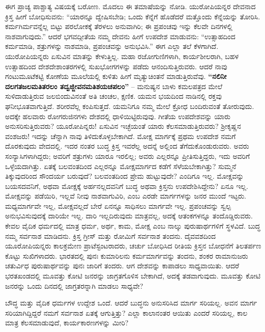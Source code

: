 ಈಗ ಪ್ರಾಚ್ಯ ಪಾಶ್ಚಾತ್ಯ ವಿಷಯಕ್ಕೆ ಬರೋಣ. ಮೊದಲು ಈ ತಮಾಷೆಯನ್ನು ನೋಡಿ. ಯುರೋಪಿಯನ್ನರ ದೇವನಾದ ಕ್ರಿಸ್ತ ಹೀಗೆ ಬೋಧಿಸುವನು: “ಯಾರನ್ನೂ ದ್ವೇಷಿಸಬೇಡಿ; ಒಂದು ಕೆನ್ನೆಗೆ ಹೊಡೆದರೆ ಮತ್ತೊಂದು ಕೆನ್ನೆಯನ್ನು ತೋರಿಸಿ. ಕರ್ಮ\-ಗಿರ್ಮವನ್ನೆಲ್ಲ ಬಿಟ್ಟು ಪರಲೋಕಕ್ಕೆ ತೆರಳಲು ಅನುವಾಗಿರಿ; ಈ ಪ್ರಪಂಚವು ಇನ್ನು ಕೆಲವೇ ದಿನಗಳಲ್ಲಿ ನಾಶವಾಗುವುದು.” ಆದರೆ ಭಗವದ್ಗೀತೆಯ ನಮ್ಮ ದೇವನು ಹೀಗೆ ಉಪದೇಶ ಮಾಡುವನು: “ಉತ್ಸಾಹದಿಂದ ಕರ್ಮಮಾಡಿ, ಶತ್ರುಗಳನ್ನು ನಾಶಮಾಡಿ, ಪ್ರಪಂಚವನ್ನು ಅನುಭವಿಸಿ.” ಈಗ ಎಲ್ಲಾ ತಲೆ ಕೆಳಗಾಗಿದೆ. ಯುರೋಪಿಯನ್ನರು ಏಸುವಿನ ಮಾತನ್ನು ಕೇಳುತ್ತಿಲ್ಲ. ಮಹಾ ರಜೋಗುಣಿಗಳಾಗಿ, ಕಾರ್ಯಶೀಲರಾಗಿ, ಬಹಳ ಉತ್ಸಾಹದಿಂದ ದೇಶದೇಶಾಂತರಗಳಲ್ಲಿ ಸುಖಭೋಗಗಳನ್ನು ಪಡೆದು ಆನಂದಿಸುತ್ತಿರುವರು. ಆದರೆ ನಾವು ಗಂಟುಮೂಟೆಕಟ್ಟಿ ಕೋಣೆಯ ಮೂಲೆಯಲ್ಲಿ ಕುಳಿತು ಹೀಗೆ ಮೃತ್ಯುಚಿಂತನೆ ಮಾಡುತ್ತಿರುವೆವು. \textbf{“ನಲಿನೀ ದಲಗತಜಲಮತಿತರಲಂ ತದ್ವಜ್ಜೀವನಮತಿಶಯಚಪಲಂ”} – ಮನುಷ್ಯನ ಬಾಳು ಕಮಲಪತ್ರದ ಮೇಲೆ ಸುಳಿದಾಡುತ್ತಿರುವ ಜಲಬಿಂದುವಿನಂತೆ ಅತಿ ಚಂಚಲ, ಕ್ಷಣಿಕ. ಯಮನ ಭಯದಿಂದ ನಾಡಿನಲ್ಲಿ ರಕ್ತವು ಘನೀಭೂತವಾಗುತ್ತಿದೆ. ಶರೀರವೆಲ್ಲ ಕಂಪಿಸುತ್ತದೆ. ಯಮನಿಗೂ ನಮ್ಮ ಮೇಲೆ ಕ್ರೋಧ ಬಂದಿರುವಂತೆ ತೋರುವುದು. ಅದಕ್ಕೇ ಹಲವಾರು ರೋಗರುಜಿನಗಳು ದೇಶದಲ್ಲಿ ಧಾಳಿಯಿಟ್ಟಿರುವುವು. ಗೀತೆಯ ಉಪದೇಶವನ್ನು ಯಾರು ಅನುಸರಿಸುತ್ತಿರುವರು? ಯೂರೋಪಿನ್ನರು! ಏಸುವಿನ ಇಚ್ಛೆಯಂತೆ ಯಾರು ಕೆಲಸಮಾಡುತ್ತಿರುವರು? ಶ‍್ರೀಕೃಷ್ಣನ ವಂಶಜರು! ಇದನ್ನು ಚೆನ್ನಾಗಿ ನಾವು ತಿಳಿದುಕೊಳ್ಳಬೇಕಾಗಿದೆ. ಮೋಕ್ಷ ಮಾರ್ಗಕ್ಕೆ ಪ್ರಥಮ ಉಪದೇಶ ನಮಗೆ ದೊರಕುವುದು ವೇದದಲ್ಲಿ. ಇದರ ನಂತರ ಬುದ್ಧ ಕ್ರಿಸ್ತ ಇವರೆಲ್ಲ ಅದನ್ನೆ ಅಲ್ಲಿಂದ ತೆಗೆದುಕೊಂಡುರುವರು. ಅವರು ಸಂನ್ಯಾಸಿಗಳಾಗಿದ್ದರು; ಅವರಿಗೆ ಶತ್ರುಗಳು ಯಾರೂ ಇರಲಿಲ್ಲ; ಅವರು ಎಲ್ಲರನ್ನೂ ಪ್ರೀತಿಸುತ್ತಿದ್ದರು, ಇದು ಅವರಿಗೆ ಒಳ್ಳೆಯದಾಗಿತ್ತು. ಏತಕ್ಕೆ ಬಲವಂತದಿಂದ ಎಲ್ಲರನ್ನೂ ಮೋಕ್ಷಮಾರ್ಗದ ಕಡೆಗೆ ಸೆಳೆಯಬೇಕಾಗಿತ್ತು? ಸುಮ್ಮನೆ ತಿಕ್ಕುವುದರಿಂದ ಸೌಂದರ್ಯ ಬರುವುದೆ? ಬಲವಂತದಿಂದ ಪ್ರೇಮ ಹುಟ್ಟುವುದೇ? ಎಂದಿಗೂ ಇಲ್ಲ. ಮೋಕ್ಷವನ್ನು ಬಯಸದವನಿಗೆ, ಅಥವಾ ಮೋಕ್ಷಕ್ಕೆ ಅರ್ಹನಲ್ಲದವನಿಗೆ ಬುದ್ಧ ಅಥವಾ ಕ್ರಿಸ್ತನು ಉಪದೇಶಿಸಿದ್ದೇನು? ಏನೂ ಇಲ್ಲ. ಮೋಕ್ಷವನ್ನು ಪಡೆಯಿರಿ, ಇಲ್ಲವೆ ನೀವು ನಾಶವಾಗುವಿರಿ, ಎಂಬ ಎರಡೇ ಮಾರ್ಗಗಳನ್ನು ಜನರ ಮುಂದೆ ಇಟ್ಟರು. ಮಧ್ಯಮಾರ್ಗವೇ ಇಲ್ಲ, ಮೋಕ್ಷವಲ್ಲದೆ ಬೇರೆ ಏನನ್ನೂ ಸಾಧಿಸಲು ಮಾರ್ಗವೇ ಇಲ್ಲ. ಪ್ರಪಂಚವನ್ನು ಸ್ವಲ್ಪ ಅನುಭವಿಸುವುದಕ್ಕೆ ದಾರಿಯೇ ಇಲ್ಲ. ದಾರಿ ಇಲ್ಲದಿರುವುದು ಮಾತ್ರವಲ್ಲ, ಅದಕ್ಕೆ ಆತಂಕಗಳನ್ನೂ ತಂದೊಡ್ಡಿರುವರು. ಕೇವಲ ವೈದಿಕ ಧರ್ಮದಲ್ಲಿ ಮಾತ್ರ ಧರ್ಮ, ಅರ್ಥ, ಕಾಮ, ಮೋಕ್ಷ ಎಂಬ ನಾಲ್ಕು ಪುರುಷಾರ್ಥಗಳಿಗೆ ಸ್ಥಳವಿದೆ. ಬುದ್ಧ ನಮ್ಮ ಸರ್ವನಾಶ ಮಾಡಿದನು. ಕ್ರಿಸ್ತ ಗ್ರೀಸ್​ ಮತ್ತು ರೋಮಿಗೆ ಸರ್ವನಾಶ ತಂದನು. ದೈವವಶದಿಂದ ಯೂರೋಪಿಯನ್ನರು ಕಾಲಕ್ರಮೇಣ ಪ್ರಾಟೆಸ್ಟಂಟರಾದರು, ಚರ್ಚು ಬೋಧಿಸಿದ ರೀತಿಯ ಕ್ರಿಸ್ತನ ಬೋಧನೆಗೆ ತಿಲತರ್ಪಣ ಕೊಟ್ಟು ಸುಖಿಗಳಾದರು. ಭಾರತದಲ್ಲಿ ಪುನಃ ಕುಮಾರಿಲನು ಕರ್ಮಮಾರ್ಗವನ್ನು ತಂದನು, ಶಂಕರ ರಾಮಾನುಜರು ಚತುರ್ವಿಧ ಪುರುಷಾರ್ಥವನ್ನು ಪುನಃ ಜಾರಿಗೆ ತಂದರು. ಆಗ ದೇಶವನ್ನು ಕಾಪಾಡಲು ಸಾಧ್ಯವಾಯಿತು. ಆದರೆ ಭರತಖಂಡದಲ್ಲಿ ಮೂವತ್ತು ಕೋಟಿ ಜನರನ್ನು ಜಾಗ್ರತಗೊಳಿಸ ಬೇಕಾಗಿದೆ, ಅದಕ್ಕೆ ತಡವಾಗು\-ವುದು. ಮೂವತ್ತು ಕೋಟಿ ಜನರನ್ನು ಒಂದು ದಿನದಲ್ಲಿ ಜಾಗ್ರತರನ್ನಾಗಿ ಮಾಡಲು ಸಾಧ್ಯವೇ?

ಬೌದ್ಧ ಮತ್ತು ವೈದಿಕ ಧರ್ಮಗಳ ಉದ್ದೇಶ ಒಂದೆ. ಆದರೆ ಬುದ್ಧನು ಅನುಸರಿಸಿದ ಮಾರ್ಗ ಸರಿಯಲ್ಲ. ಅವನ ಮಾರ್ಗ ಸರಿಯಾಗಿದ್ದಿದ್ದರೆ ನಮಗೆ ಸರ್ವನಾಶ ಏತಕ್ಕೆ ಆಗುತ್ತಿತ್ತು? ಎಲ್ಲಾ ಕಾಲಾನಂತರ ಆಯಿತು ಎಂದರೆ ಸರಿಯಲ್ಲ, ಕಾಲ ಮಾತ್ರ ಕೆಲಸಮಾಡು\break ವುದೆ, ಕಾರ್ಯಕಾರಣಗಳನ್ನು ಮೀರಿ?

